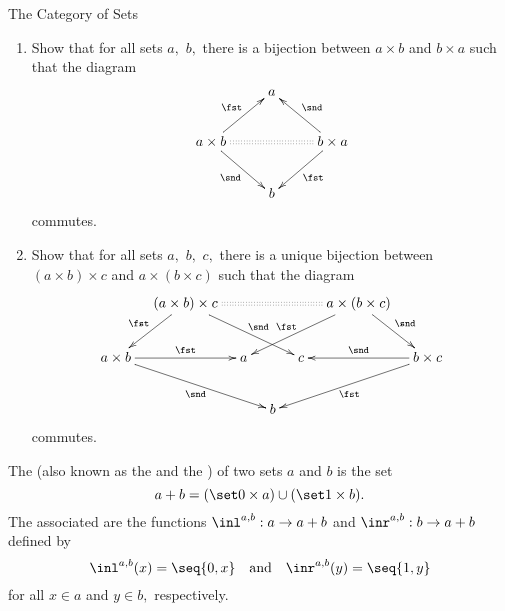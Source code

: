 \begin{unit}{The Category of Sets}
\begin{problem}\label{P:UPP:Arith}
  \begin{enumerate}[\upshape(a)]
  \item\label{C:UPP:Commutativity}
    Show that for all sets \(a,\) \(b,\) there is a bijection between \(a \times b\) and \(b \times a\) such that the diagram \[\xymatrix{
      & a \\
      a \times b \ar[ru]^-{\fst} \ar[rd]_-{\snd} \ar@{:}[rr] && b \times a \ar[ld]^-{\fst} \ar[lu]_-{\snd}\\
      & b
    }\] commutes.
  \item\label{C:UPP:Associativity}
    Show that for all sets \(a,\) \(b,\) \(c,\) there is a unique bijection between \((a \times b) \times c\) and \(a \times (b \times c)\) such that the diagram
    \[\xymatrix@C1em{
      &(a \times b) \times c \ar[dl]_-{\fst} \ar[drrr]^-{\snd} \ar@{:}[rrrr] &&&& a \times (b \times c) \ar[dr]^-{\snd} \ar[dlll]_-{\fst} \\
      a \times b \ar[rr]^-{\fst} \ar[drrr]_-{\snd} && a && c && b \times c \ar[ll]_-{\snd} \ar[dlll]^-{\fst} \\
      &&& b 
    }\]
    commutes.
  \end{enumerate}
\end{problem}



\begin{definition}\label{D:Coproduct}
  The  (also known as the  and the ) of two sets \(a\) and \(b\) is the set \[a + b = (\set0\times a) \cup (\set1\times b).\]
  The associated  are the functions \(\inl^{a,b}:a \to a+b\) and \(\inr^{a,b}: b \to a+b\) defined by \[\inl^{a,b}(x) = \seq{0,x} \quad\mbox{and}\quad \inr^{a,b}(y) = \seq{1,y}\] for all \(x \in a\) and \(y \in b,\) respectively.
\end{definition}


\end{unit}
